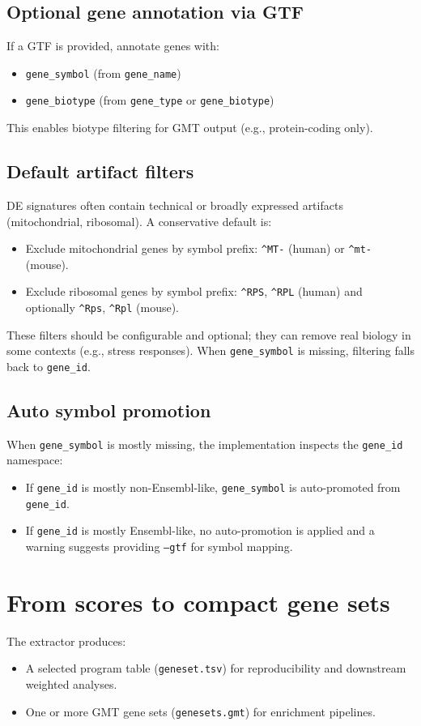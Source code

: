 \documentclass[11pt]{article}
\begin{document}
\subsection{Optional gene annotation via GTF}
If a GTF is provided, annotate genes with:
\begin{itemize}[leftmargin=2em]
\item \texttt{gene\_symbol} (from \texttt{gene\_name})
\item \texttt{gene\_biotype} (from \texttt{gene\_type} or \texttt{gene\_biotype})
\end{itemize}
This enables biotype filtering for GMT output (e.g., protein-coding only).

\subsection{Default artifact filters}
DE signatures often contain technical or broadly expressed artifacts (mitochondrial, ribosomal). A conservative default is:
\begin{itemize}[leftmargin=2em]
\item Exclude mitochondrial genes by symbol prefix: \texttt{\^{ }MT-} (human) or \texttt{\^{ }mt-} (mouse).
\item Exclude ribosomal genes by symbol prefix: \texttt{\^{ }RPS}, \texttt{\^{ }RPL} (human) and optionally \texttt{\^{ }Rps}, \texttt{\^{ }Rpl} (mouse).
\end{itemize}
These filters should be configurable and optional; they can remove real biology in some contexts (e.g., stress responses).
When \texttt{gene\_symbol} is missing, filtering falls back to \texttt{gene\_id}.

\subsection{Auto symbol promotion}
When \texttt{gene\_symbol} is mostly missing, the implementation inspects the \texttt{gene\_id} namespace:
\begin{itemize}[leftmargin=2em]
\item If \texttt{gene\_id} is mostly non-Ensembl-like, \texttt{gene\_symbol} is auto-promoted from \texttt{gene\_id}.
\item If \texttt{gene\_id} is mostly Ensembl-like, no auto-promotion is applied and a warning suggests providing \texttt{--gtf} for symbol mapping.
\end{itemize}

\section{From scores to compact gene sets}
The extractor produces:
\begin{itemize}[leftmargin=2em]
\item A selected program table (\texttt{geneset.tsv}) for reproducibility and downstream weighted analyses.
\item One or more GMT gene sets (\texttt{genesets.gmt}) for enrichment pipelines.
\end{itemize}
\end{document}
